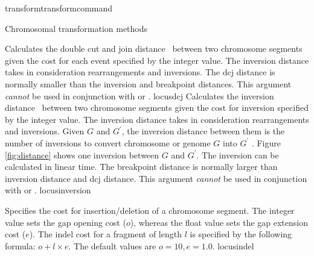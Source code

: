 \begin{command}{transform}{transformcommand}
\begin{arguments}
\begin{argumentgroup}{Chromosomal transformation methods}
\begin{description}
                        {Calculates the double cut and join
                        distance~\cite{yancopoulos:2005}
                        between two chromosome segments given the cost for each
                        event specified by the integer value. The inversion distance
                        takes in consideration rearrangements and
                        inversions. The dcj distance is normally smaller than
                        the inversion and breakpoint distances.
                        This argument \emph{cannot} be used in conjunction with
                         or
                        .} 
                        {locusdcj}
                        {Calculates the inversion distance~\cite{hanenhalliandpevzner1995}
                        between two chromosome segments given the cost for inversion
                        specified by the integer value. The inversion distance
                        takes in consideration rearrangements and
                        inversions. Given $G$ and $G^\prime$, the inversion distance between
                        them is the number of inversions to convert chromosome or genome $G$ 
                        into $G^\prime$ \cite{hanenhalliandpevzner1995}. Figure \ref{fig:distance} shows one inversion  
                        between $G$ and $G^\prime$. The inversion can be calculated in linear time.
                        The breakpoint distance is normally larger than
                        inversion distance  and dcj distance.
                        This argument \emph{cannot} be used in conjunction with
                         or
                        .} 
                        {locusinversion}  

                        {Specifies the cost for insertion/deletion of a
                        chromosome segment. The integer value sets the gap opening
                        cost ($o$), whereas the float value sets the gap extension
                        cost ($e$).  The indel cost for a fragment of length $l$ is
                        specified by the following formula:
                       $o + l \times e$. The default values are $o=10, e=1.0$.}
                        {locusindel}


\end{description}
\end{argumentgroup}
\end{arguments}
\end{command}
